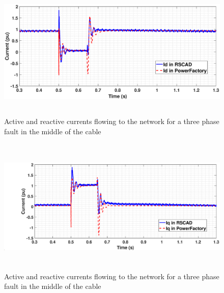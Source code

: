 \begin{figure}[H]
\hspace*{-0.1cm}
    \includegraphics[height = 6.5cm,width = 15.5cm]{Diagrams/Chapter_3/ID_RSCAD_PFD_Comp.eps}
    \caption{Active and reactive currents flowing to the network for a three phase fault in the middle of the cable}
    \label{fig:ID_IQ_fullACSource}
\end{figure}

\begin{figure}[H]
\hspace*{-0.1cm}
    \includegraphics[height = 6.5cm,width = 15.5cm]{Diagrams/Chapter_3/IQ_RSCAD_PFD_Comp.eps}
    \caption{Active and reactive currents flowing to the network for a three phase fault in the middle of the cable}
    \label{fig:ID_IQ_fullACSource}
\end{figure}